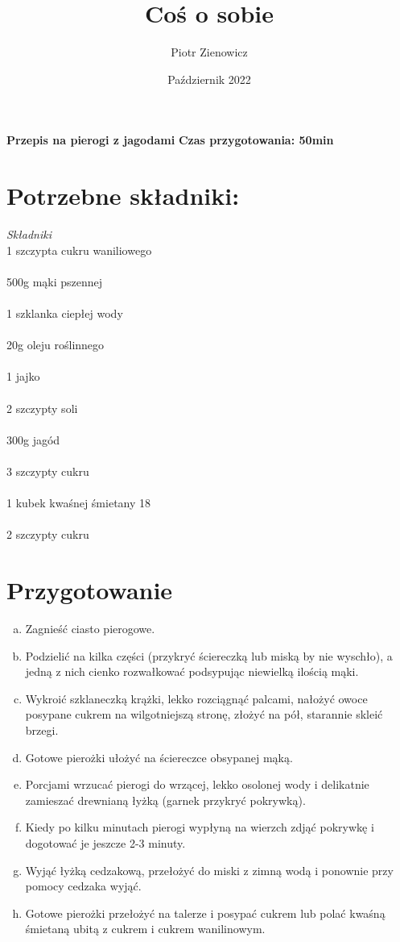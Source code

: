 \documentclass[12pt, letterpaper, titlepage]{article}
\title{Coś o sobie}
\author{Piotr Zienowicz}
\date{Październik 2022}
\begin{document}
\maketitle
\textbf{Przepis na pierogi z jagodami}
\textbf{Czas przygotowania: 50min}
\section{Potrzebne składniki:}
\textit{Składniki}
\\ 1 szczypta cukru waniliowego\\
\\ 500g mąki pszennej\\
\\ 1 szklanka ciepłej wody\\
\\ 20g oleju roślinnego\\
\\ 1 jajko\\
\\ 2 szczypty soli\\
\\ 300g jagód\\
\\ 3 szczypty cukru\\
\\ 1 kubek kwaśnej śmietany 18\\
\\ 2 szczypty cukru\\
\section{Przygotowanie}
\begin{enumerate}[a)]
\item{Zagnieść ciasto pierogowe.}
\item{Podzielić na kilka części (przykryć ściereczką lub miską by nie wyschło), a jedną z nich cienko rozwałkować podsypując niewielką ilością mąki.}
\item{Wykroić szklaneczką krążki, lekko rozciągnąć palcami, nałożyć owoce posypane cukrem na wilgotniejszą stronę, złożyć na pół, starannie skleić brzegi.}
\item{Gotowe pierożki ułożyć na ściereczce obsypanej mąką.}
\item{Porcjami wrzucać pierogi do wrzącej, lekko osolonej wody i delikatnie zamieszać drewnianą łyżką (garnek przykryć pokrywką).}
\item{Kiedy po kilku minutach pierogi wypłyną na wierzch zdjąć pokrywkę i dogotować je jeszcze 2-3 minuty.}
\item{Wyjąć łyżką cedzakową, przełożyć do miski z zimną wodą i ponownie przy pomocy cedzaka wyjąć.}
\item{Gotowe pierożki przełożyć na talerze i posypać cukrem lub polać kwaśną śmietaną ubitą z cukrem i cukrem wanilinowym.}
\end{enumerate}
\end{document}
